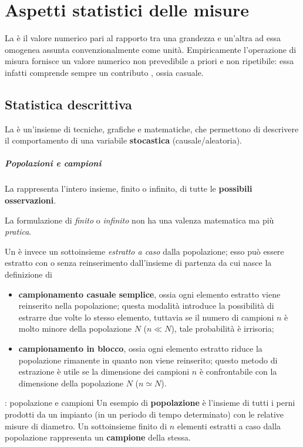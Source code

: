 \chapter{Aspetti statistici delle misure}
	La  è il valore numerico pari al rapporto tra una grandezza e un'altra ad essa omogenea assunta convenzionalmente come unità. Empiricamente l'operazione di misura fornisce un valore numerico non prevedibile a priori e non ripetibile: essa infatti comprende sempre un contributo , ossia casuale.
	
\section{Statistica descrittiva}
	La  è un'insieme di tecniche, grafiche e matematiche, che permettono di descrivere il comportamento di una variabile \textbf{stocastica} (causale/aleatoria).
	
	\paragraph{Popolazioni e campioni} La  rappresenta l'intero insieme, finito o infinito, di tutte le \textbf{possibili osservazioni}. 
	\begin{nota}
		La formulazione di \textit{finito} o \textit{ infinito} non ha una valenza matematica ma più \textit{pratica}.
	\end{nota} 
	
	Un  è invece un sottoinsieme \textit{estratto a caso} dalla popolazione; esso può essere estratto con o senza reinserimento dall'insieme di partenza da cui nasce la definizione di
	\begin{itemize}
		\item \textbf{campionamento casuale semplice}, ossia ogni elemento estratto viene reinserito nella popolazione; questa modalità introduce la possibilità di estrarre due volte lo stesso elemento, tuttavia se il numero di campioni $n$ è molto minore della popolazione $N$ ($n\ll N$), tale probabilità è irrisoria;
		\item \textbf{campionamento in blocco}, ossia ogni elemento estratto riduce la popolazione rimanente in quanto non viene reinserito; questo metodo di estrazione è utile se la dimensione dei campioni $n$ è confrontabile con la dimensione della popolazione $N$ ($n\simeq N$).
	\end{itemize}
	
	\begin{esempio}{: popolazione e campioni}
		Un esempio di \textbf{popolazione} è l'insieme di tutti i perni prodotti da un impianto (in un periodo di tempo determinato) con le relative misure di diametro. Un sottoinsieme finito di $n$ elementi estratti a caso dalla popolazione rappresenta un \textbf{campione} della stessa.
	\end{esempio}
	
